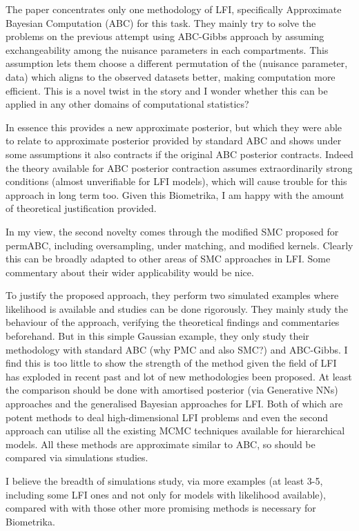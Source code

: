 \documentclass[10.5pt]{article}
\begin{document}
The paper concentrates only one methodology of LFI, specifically Approximate Bayesian Computation (ABC) for this task. They mainly try to solve the problems on the previous attempt using ABC-Gibbs approach by assuming exchangeability among the nuisance parameters in each compartments. This assumption lets them choose a different permutation of the (nuisance parameter, data) which aligns to the observed datasets better, making computation more efficient. This is a novel twist in the story and I wonder whether this can be applied in any other domains of computational statistics? 

In essence this provides a new approximate posterior, but which they were able to relate to approximate posterior provided by standard ABC and shows under some assumptions it also contracts if the original ABC posterior contracts. Indeed the theory available for ABC posterior contraction assumes extraordinarily strong conditions (almost unverifiable for LFI models), which will cause trouble for this approach in long term too. Given this Biometrika, I am happy with the amount of theoretical justification provided. 

In my view, the second novelty comes through the modified SMC proposed for permABC, including oversampling, under matching, and modified kernels. Clearly this can be broadly adapted to other areas of SMC approaches in LFI. Some commentary about their wider applicability would be nice. 

To justify the proposed approach, they perform two simulated examples where likelihood is available and studies can be done rigorously. They mainly study the behaviour of the approach, verifying the theoretical findings and commentaries beforehand. But in this simple Gaussian example, they only study their methodology with standard ABC (why PMC and also SMC?) and ABC-Gibbs. I find this is too little to show the strength of the method given the field of LFI has exploded in recent past and lot of new methodologies been proposed. At least the comparison should be done with amortised posterior (via Generative NNs) approaches and the generalised Bayesian approaches for LFI. Both of which are potent methods to deal high-dimensional LFI problems and even the second approach can utilise all the existing MCMC techniques available for hierarchical models. All these methods are approximate similar to ABC, so should be compared via simulations studies. 

I believe the breadth of simulations study, via more examples (at least 3-5, including some LFI ones and not only for models with likelihood available), compared with with those other more promising methods is necessary for Biometrika. 
\end{document}

